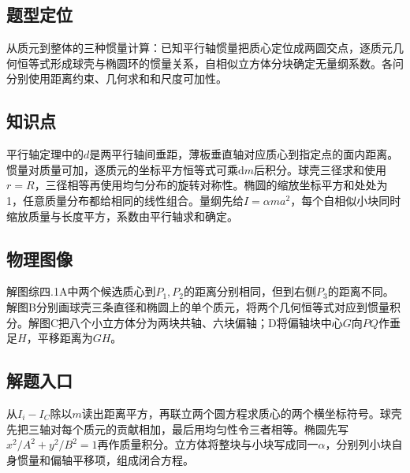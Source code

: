 \documentclass[UTF8,fontset=fandol,a4paper,11pt]{ctexart}
\begin{document}


\subsection*{题型定位}

从质元到整体的三种惯量计算：已知平行轴惯量把质心定位成两圆交点，逐质元几何恒等式形成球壳与椭圆环的惯量关系，自相似立方体分块确定无量纲系数。各问分别使用距离约束、几何求和和尺度可加性。



\subsection*{知识点}

平行轴定理中的$d$是两平行轴间垂距，薄板垂直轴对应质心到指定点的面内距离。惯量对质量可加，逐质元的坐标平方恒等式可乘$\mathrm dm$后积分。球壳三径求和使用$r=R$，三径相等再使用均匀分布的旋转对称性。椭圆的缩放坐标平方和处处为1，任意质量分布都给相同的线性组合。量纲先给$I=\alpha ma^2$，每个自相似小块同时缩放质量与长度平方，系数由平行轴求和确定。



\subsection*{物理图像}

解图综四.1A中两个候选质心到$P_1,P_2$的距离分别相同，但到右侧$P_3$的距离不同。解图B分别画球壳三条直径和椭圆上的单个质元，将两个几何恒等式对应到惯量积分。解图C把八个小立方体分为两块共轴、六块偏轴；D将偏轴块中心$G$向$PQ$作垂足$H$，平移距离为$GH$。



\subsection*{解题入口}

从$I_i-I_C$除以$m$读出距离平方，再联立两个圆方程求质心的两个横坐标符号。球壳先把三轴对每个质元的贡献相加，最后用均匀性令三者相等。椭圆先写$x^2/A^2+y^2/B^2=1$再作质量积分。立方体将整块与小块写成同一$\alpha$，分别列小块自身惯量和偏轴平移项，组成闭合方程。
\end{document}
